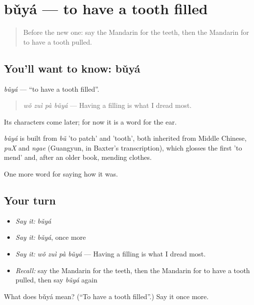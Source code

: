 \section[bǔyá]{bǔyá — to have a tooth filled}

\label{lesson:ZH-C473-buya}



\begin{quote}
Before the new one: say the Mandarin for the teeth, then the Mandarin for to have a tooth pulled.
\end{quote}

\subsection*{You'll want to know: bǔyá}
\emph{bǔyá} — \textquotedblleft{}to have a tooth filled\textquotedblright{}.

\begin{quote}
\emph{wǒ zuì pà bǔyá} — Having a filling is what I dread most.
\end{quote}

Its characters come later; for now it is a word for the ear.

\begin{cousinweb}
\emph{bǔyá} is built from \emph{bǔ} 'to patch' and  'tooth', both inherited from Middle Chinese, \emph{puX} and \emph{ngae} (Guangyun, in Baxter's transcription), which glosses the first 'to mend' and, after an older book, mending clothes.
\end{cousinweb}

\begin{grammarlens}[title={What you've built}]
One more word for saying how it was.
\end{grammarlens}

\subsection*{Your turn}
\begin{itemize}
\raggedright
  \item \emph{Say it:} \emph{bǔyá}
  \item \emph{Say it:} \emph{bǔyá}, once more
  \item \emph{Say it:} \emph{wǒ zuì pà bǔyá} — Having a filling is what I dread most.
  \item \emph{Recall:} say the Mandarin for the teeth, then the Mandarin for to have a tooth pulled, then say \emph{bǔyá} again
\end{itemize}

\begin{tcolorbox}[breakable,colback=teal!4,colframe=teal!35!black,title={Before you move on}]
What does bǔyá mean? (\textquotedblleft{}To have a tooth filled\textquotedblright{}.) Say it once more.
\end{tcolorbox}
